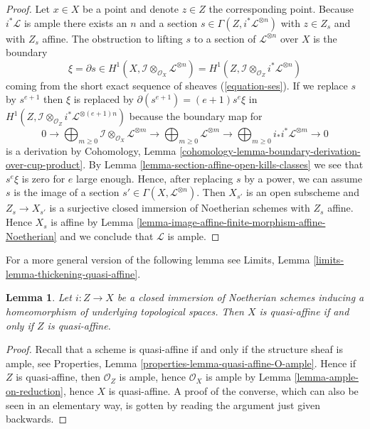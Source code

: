\documentclass{stacks-project}
\theoremstyle{plain}
\newtheorem{lemma}[subsection]{Lemma}
\theoremstyle{definition}
\theoremstyle{remark}
\numberwithin{equation}{subsection}
\begin{document}
\begin{proof}
\medskip\noindent
Let $x \in X$ be a point and denote $z \in Z$ the corresponding point.
Because $i^*\mathcal{L}$ is ample there exists an $n$ and a section
$s \in \Gamma(Z, i^*\mathcal{L}^{\otimes n})$ with $z \in Z_s$
and with $Z_s$ affine. The obstruction to lifting $s$ to a section
of $\mathcal{L}^{\otimes n}$ over $X$ is the boundary
$$
\xi = \partial s \in
H^1(X, \mathcal{I} \otimes_{\mathcal{O}_X} \mathcal{L}^{\otimes n}) =
H^1(Z, \mathcal{I} \otimes_{\mathcal{O}_Z} i^*\mathcal{L}^{\otimes n})
$$
coming from the short exact sequence of sheaves (\ref{equation-ses}).
If we replace $s$ by $s^{e + 1}$ then $\xi$ is replaced by
$\partial(s^{e + 1}) = (e + 1) s^e \xi$ in
$H^1(Z, \mathcal{I} \otimes_{\mathcal{O}_Z} i^*\mathcal{L}^{\otimes (e + 1)n})$
because the boundary map for
$$
0 \to
\bigoplus\nolimits_{m \geq 0}
\mathcal{I} \otimes_{\mathcal{O}_X} \mathcal{L}^{\otimes m} \to
\bigoplus\nolimits_{m \geq 0}
\mathcal{L}^{\otimes m} \to
\bigoplus\nolimits_{m \geq 0}
i_*i^*\mathcal{L}^{\otimes m} \to 0
$$
is a derivation by Cohomology, Lemma
\ref{cohomology-lemma-boundary-derivation-over-cup-product}. By
Lemma \ref{lemma-section-affine-open-kills-classes}
we see that $s^e \xi$ is zero for $e$ large enough.
Hence, after replacing $s$ by a power, we can assume $s$ is the image
of a section $s' \in \Gamma(X, \mathcal{L}^{\otimes n})$.
Then $X_{s'}$ is an open subscheme and $Z_s \to X_{s'}$ is a surjective
closed immersion of Noetherian schemes with $Z_s$ affine. Hence
$X_s$ is affine by
Lemma \ref{lemma-image-affine-finite-morphism-affine-Noetherian} and
we conclude that $\mathcal{L}$ is ample.
\end{proof}

\noindent
For a more general version of the following lemma see
Limits, Lemma \ref{limits-lemma-thickening-quasi-affine}.

\begin{lemma}
\label{lemma-thickening-quasi-affine}
Let $i : Z \to X$ be a closed immersion of Noetherian schemes
inducing a homeomorphism of underlying topological spaces.
Then $X$ is quasi-affine if and only if $Z$ is quasi-affine.
\end{lemma}

\begin{proof}
Recall that a scheme is quasi-affine
if and only if the structure sheaf is ample, see
Properties, Lemma \ref{properties-lemma-quasi-affine-O-ample}.
Hence if $Z$ is quasi-affine, then $\mathcal{O}_Z$ is ample,
hence $\mathcal{O}_X$ is ample by
Lemma \ref{lemma-ample-on-reduction}, hence
$X$ is quasi-affine. A proof of the converse, which
can also be seen in an elementary way, is gotten by
reading the argument just given backwards.
\end{proof}
\end{document}
